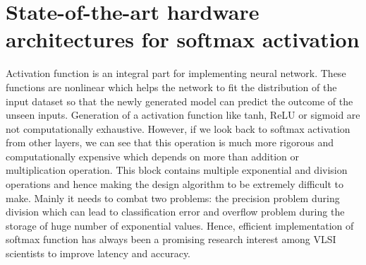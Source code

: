 \documentclass[journal]{IEEEtran}
\begin{document}
\section{State-of-the-art hardware architectures for softmax activation}
Activation function is an integral part for implementing neural network. These functions are nonlinear which helps the network to fit the distribution of the input dataset so that the newly generated model can predict the outcome of the unseen inputs. Generation of a activation function like tanh, ReLU or sigmoid are not computationally exhaustive. However, if we look back to softmax activation from other layers, we can see that this operation is much more rigorous and computationally expensive which depends on more than addition or multiplication operation. This block contains multiple exponential and division operations and hence making the design algorithm to be extremely difficult to make. Mainly it needs to combat two problems: the precision problem during division which can lead to classification error and overflow problem during the storage of huge number of exponential values. Hence, efficient implementation of softmax function has always been a promising research interest among VLSI scientists to improve latency and accuracy.
\end{document}

